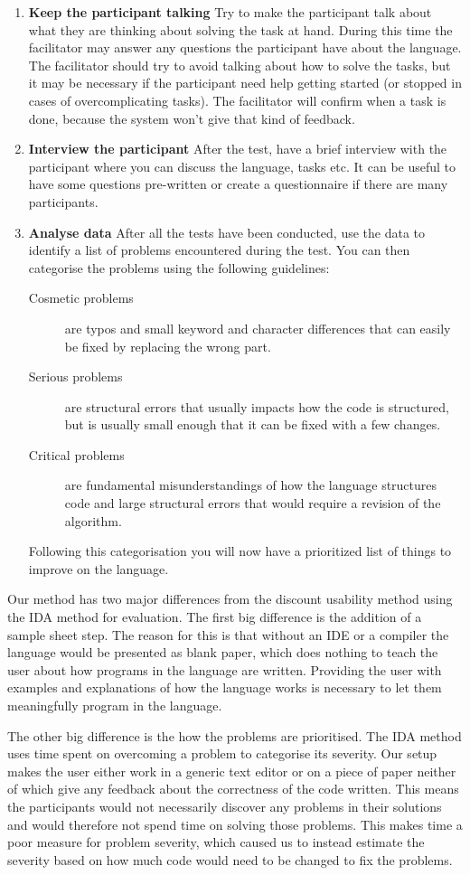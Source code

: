 \documentclass[preprint,10pt]{sigplanconf}
\begin{document}
\begin{enumerate}
\item \textbf{Keep the participant talking} Try to make the participant talk about what they are thinking about solving the task at hand. During this time the facilitator may answer any questions the participant have about the language. The facilitator should try to avoid talking about how to solve the tasks, but it may be necessary if the participant need help getting started (or stopped in cases of overcomplicating tasks). The facilitator will confirm when a task is done, because the system won't give that kind of feedback.
\item \textbf{Interview the participant} After the test, have a brief interview with the participant where you can discuss the language, tasks etc. It can be useful to have some questions pre-written or create a questionnaire if there are many participants.
\item \textbf{Analyse data} After all the tests have been conducted, use the data to identify a list of problems encountered during the test. You can then categorise the problems using the following guidelines:
\begin{description}
\item[Cosmetic problems] are typos and small keyword and character differences that can easily be fixed by replacing the wrong part.
\item[Serious problems] are structural errors that usually impacts how the code is structured, but is usually small enough that it can be fixed with a few changes.
\item[Critical problems] are fundamental misunderstandings of how the language structures code and large structural errors that would require a revision of the algorithm.
\end{description}
Following this categorisation you will now have a prioritized list of things to improve on the language.
\end{enumerate}

Our method has two major differences from the discount usability method using the IDA method for evaluation.
The first big difference is the addition of a sample sheet step. The reason for this is that without an IDE or a compiler the language would be presented as blank paper, which does nothing to teach the user about how programs in the language are written. Providing the user with examples and explanations of how the language works is necessary to let them meaningfully program in the language.

The other big difference is the how the problems are prioritised. The IDA method uses time spent on overcoming a problem to categorise its severity. Our setup makes the user either work in a generic text editor or on a piece of paper neither of which give any feedback about the correctness of the code written. This means the participants would not necessarily discover any problems in their solutions and would therefore not spend time on solving those problems.
This makes time a poor measure for problem severity, which caused us to instead estimate the severity based on how much code would need to be changed to fix the problems.
\end{document}
